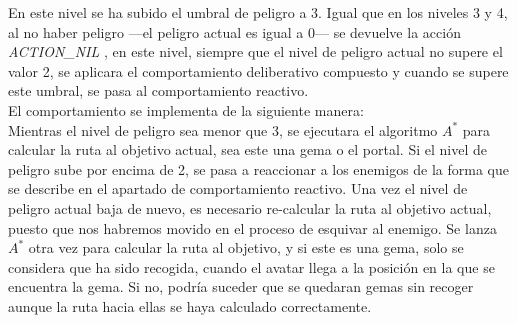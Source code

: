 En este nivel se ha subido el umbral de peligro a 3. Igual que en los niveles 3 y 4, al no haber peligro ---el peligro actual es igual a 0--- se devuelve la acción \emph{ACTION\_NIL} , en este nivel, siempre que el nivel de peligro actual no supere el valor 2, se aplicara el comportamiento deliberativo compuesto y cuando se supere este umbral, se pasa al comportamiento reactivo.\\

El comportamiento se implementa de la siguiente manera:\\
Mientras el nivel de peligro sea menor que 3, se ejecutara el algoritmo $ A^{*} $ para calcular la ruta al objetivo actual, sea este una gema o el portal. Si el nivel de peligro sube por encima de 2, se pasa a reaccionar a los enemigos de la forma que se describe en el apartado de comportamiento reactivo. Una vez el nivel de peligro actual baja de nuevo, es necesario re-calcular la ruta al objetivo actual, puesto que nos habremos movido en el proceso de esquivar al enemigo. Se lanza $ A^{*} $ otra vez para calcular la ruta al objetivo, y si este es una gema, solo se considera que ha sido recogida, cuando el avatar llega a la posición en la que se encuentra la gema. Si no, podría suceder que se quedaran gemas sin recoger aunque la ruta hacia ellas se haya calculado correctamente.
